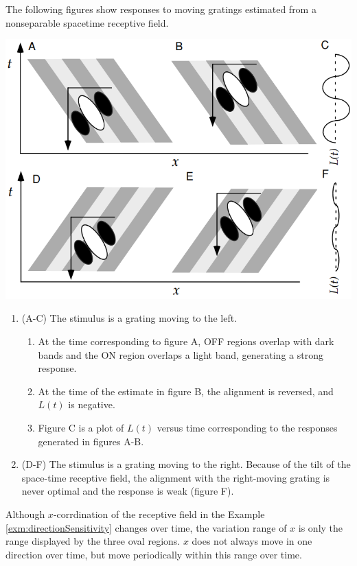 \begin{exm}
  \label{exm:directionSensitivity}
  The following figures show responses to moving gratings estimated from a nonseparable spacetime receptive field.
  \begin{center}
    \includegraphics[scale=0.3]{./png/directionSensitivity}
  \end{center}
  \begin{enumerate}[]
  \item (A-C) The stimulus is a grating moving to the left.
    \begin{enumerate}[-]
    \item At the time corresponding to figure A, OFF regions overlap with dark bands and the ON region overlaps a light band, generating a strong response.
    \item At the time of the estimate in figure B, the alignment is reversed, and $L(t)$ is negative.
    \item Figure C is a plot of $L(t)$ versus time corresponding to the responses generated in figures A-B.
    \end{enumerate}
  \item (D-F) The stimulus is a grating moving to the right. Because of the tilt of the space-time receptive field, the alignment with the right-moving grating is never optimal and the response is weak (figure F).
  \end{enumerate}
\end{exm}

\begin{rem}
  Although $x$-corrdination of the receptive field in the Example \ref{exm:directionSensitivity} changes over time, the variation range of $x$ is only the range displayed by the three oval regions. $x$ does not always move in one direction over time, but move periodically within this range over time.
\end{rem}

